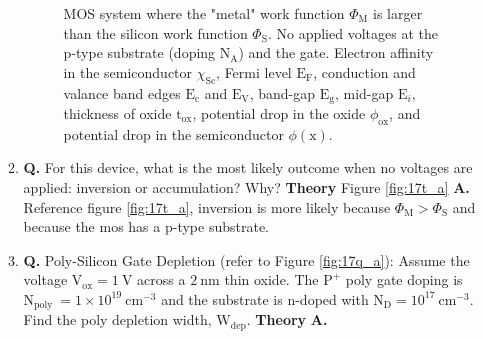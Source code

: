 \documentclass[main.tex]{subfiles}
\begin{document}
\begin{enumerate}
\begin{enumerate}
        \begin{figure}
        \centering{}
        \caption{MOS system where the "metal" work function $\Phi_{\mathrm{M}}$ is larger than the silicon work function $\Phi_{\mathrm{S}}$. No applied voltages at the p-type substrate (doping $\mathrm{N}_{\mathrm{A}}$) and the gate. Electron affinity in the semiconductor $\chi_{\mathrm{Sc}}$, Fermi level $\mathrm{E}_{\mathrm{F}}$, conduction and valance band edges $\mathrm{E}_{\mathrm{c}}$ and $\mathrm{E}_{\mathrm{V}}$, band-gap $\mathrm{E}_{\mathrm{g}}$, mid-gap $\mathrm{E}_{i}$, thickness of oxide $\mathrm{t}_{\mathrm{ox}}$, potential drop in the oxide $\phi_{\mathrm{ox}}$, and potential drop in the semiconductor $\phi(\mathrm{x})$.}
        \label{fig:17a_a}
        \end{figure}
        
        \item \textbf{Q.} For this device, what is the most likely outcome when no voltages are applied: inversion or accumulation? Why? \textbf{Theory} Figure \ref{fig:17t_a} \textbf{A.} Reference figure \ref{fig:17t_a}, inversion is more likely because $\Phi_{\mathrm{M}} > \Phi_{\mathrm{S}}$ and because the mos has a p-type substrate.
        
        \item \textbf{Q.} Poly-Silicon Gate Depletion (refer to Figure \ref{fig:17q_a}): Assume the voltage $\mathrm{V}_{\mathrm{ox}} = \qty{1}{\volt}$ across a $\qty{2}{\nano\meter}$ thin  oxide. The $\mathrm{P}^{+}$ poly gate doping is $\mathrm{N}_{\text {poly }}=1 \times 10^{19} \mathrm{~cm}^{-3}$ and the substrate is n-doped with $\mathrm{N}_{\mathrm{D}}=10^{17} \mathrm{~cm}^{-3}$. Find the poly depletion width, $\mathrm{W}_{\mathrm{dep }}$. \textbf{Theory} \textbf{A.}
        

\end{enumerate}
\end{enumerate}
\end{document}
